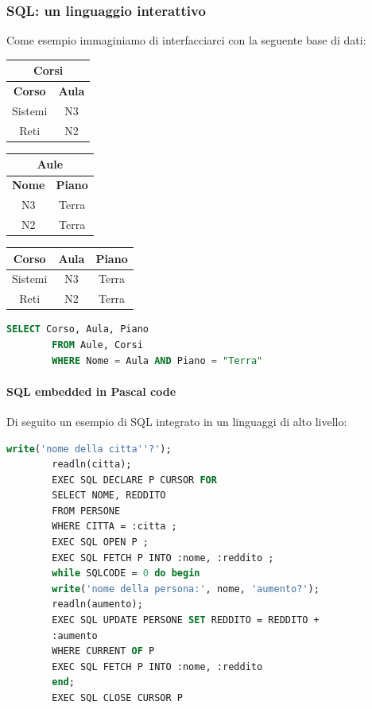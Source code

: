 \documentclass[../main.tex]{subfiles}
\begin{document}
	\subsubsection{SQL: un linguaggio interattivo}
	Come esempio immaginiamo di interfacciarci con la seguente base di dati:
	\begin{table}[ht]
		\begin{minipage}{.2\linewidth}
			\centering
			\begin{tabular}{ |c|c| }
				\hline
				\multicolumn{2}{|c|}{\textbf{Corsi}} \\
				\hline
				\textbf{Corso} & \textbf{Aula} \\
				\hline
				Sistemi & N3 \\
				Reti & N2\\
				\hline
			\end{tabular}
		\end{minipage}
		\hfill
		\begin{minipage}{.2\linewidth}
			\centering
			\begin{tabular}{ |c|c| }
				\hline
				\multicolumn{2}{|c|}{\textbf{Aule}} \\
				\hline
				\textbf{Nome} & \textbf{Piano} \\
				\hline
				N3 & Terra \\
				N2 & Terra \\
				\hline
			\end{tabular}
		\end{minipage}
		\hfill
		\begin{minipage}{.2\linewidth}
			\begin{tabular}{ |c|c|c| }
				\hline
				\textbf{Corso} & \textbf{Aula} & \textbf{Piano}\\
				\hline
				Sistemi & N3 & Terra \\
				Reti & N2 & Terra \\
				\hline
			\end{tabular}
		\end{minipage}
	\end{table}
	\begin{lstlisting}[language=SQL]
		SELECT Corso, Aula, Piano 
		FROM Aule, Corsi 
		WHERE Nome = Aula AND Piano = "Terra"
	\end{lstlisting}
	\paragraph{SQL embedded in Pascal code}
	Di seguito un esempio di SQL integrato in un linguaggi di alto livello:
	\begin{lstlisting}[language=Pascal]
		write('nome della citta''?'); 
		readln(citta); 
		EXEC SQL DECLARE P CURSOR FOR 
		SELECT NOME, REDDITO 
		FROM PERSONE 
		WHERE CITTA = :citta ;
		EXEC SQL OPEN P ; 
		EXEC SQL FETCH P INTO :nome, :reddito ; 
		while SQLCODE = 0 do begin 
		write('nome della persona:', nome, 'aumento?'); 
		readln(aumento); 
		EXEC SQL UPDATE PERSONE SET REDDITO = REDDITO + 
		:aumento 
		WHERE CURRENT OF P 
		EXEC SQL FETCH P INTO :nome, :reddito 
		end; 
		EXEC SQL CLOSE CURSOR P
	\end{lstlisting}
\end{document}
